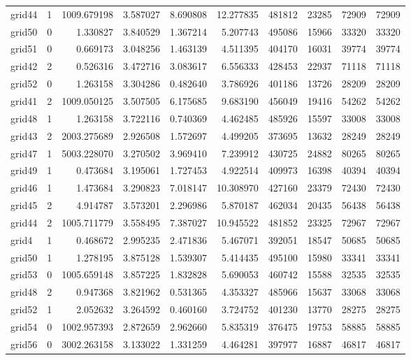 \begin{longtable}{|l|r|r|r|r|r|r|r|r|r|}
grid44 & 1 & 1009.679198 & 3.587027 & 8.690808 & 12.277835 & 481812 & 23285 & 72909 & 72909 \\
grid50 & 0 & 1.330827 & 3.840529 & 1.367214 & 5.207743 & 495086 & 15966 & 33320 & 33320 \\
grid51 & 0 & 0.669173 & 3.048256 & 1.463139 & 4.511395 & 404170 & 16031 & 39774 & 39774 \\
grid42 & 2 & 0.526316 & 3.472716 & 3.083617 & 6.556333 & 428453 & 22937 & 71118 & 71118 \\
grid52 & 0 & 1.263158 & 3.304286 & 0.482640 & 3.786926 & 401186 & 13726 & 28209 & 28209 \\
grid41 & 2 & 1009.050125 & 3.507505 & 6.175685 & 9.683190 & 456049 & 19416 & 54262 & 54262 \\
grid48 & 1 & 1.263158 & 3.722116 & 0.740369 & 4.462485 & 485926 & 15597 & 33008 & 33008 \\
grid43 & 2 & 2003.275689 & 2.926508 & 1.572697 & 4.499205 & 373695 & 13632 & 28249 & 28249 \\
grid47 & 1 & 5003.228070 & 3.270502 & 3.969410 & 7.239912 & 430725 & 24882 & 80265 & 80265 \\
grid49 & 1 & 0.473684 & 3.195061 & 1.727453 & 4.922514 & 409973 & 16398 & 40394 & 40394 \\
grid46 & 1 & 1.473684 & 3.290823 & 7.018147 & 10.308970 & 427160 & 23379 & 72430 & 72430 \\
grid45 & 2 & 4.914787 & 3.573201 & 2.296986 & 5.870187 & 462034 & 20435 & 56438 & 56438 \\
grid44 & 2 & 1005.711779 & 3.558495 & 7.387027 & 10.945522 & 481852 & 23325 & 72967 & 72967 \\
grid4 & 1 & 0.468672 & 2.995235 & 2.471836 & 5.467071 & 392051 & 18547 & 50685 & 50685 \\
grid50 & 1 & 1.278195 & 3.875128 & 1.539307 & 5.414435 & 495100 & 15980 & 33341 & 33341 \\
grid53 & 0 & 1005.659148 & 3.857225 & 1.832828 & 5.690053 & 460742 & 15588 & 32535 & 32535 \\
grid48 & 2 & 0.947368 & 3.821962 & 0.531365 & 4.353327 & 485966 & 15637 & 33068 & 33068 \\
grid52 & 1 & 2.052632 & 3.264592 & 0.460160 & 3.724752 & 401230 & 13770 & 28275 & 28275 \\
grid54 & 0 & 1002.957393 & 2.872659 & 2.962660 & 5.835319 & 376475 & 19753 & 58885 & 58885 \\
grid56 & 0 & 3002.263158 & 3.133022 & 1.331259 & 4.464281 & 397977 & 16887 & 46817 & 46817 \\

\end{longtable}
